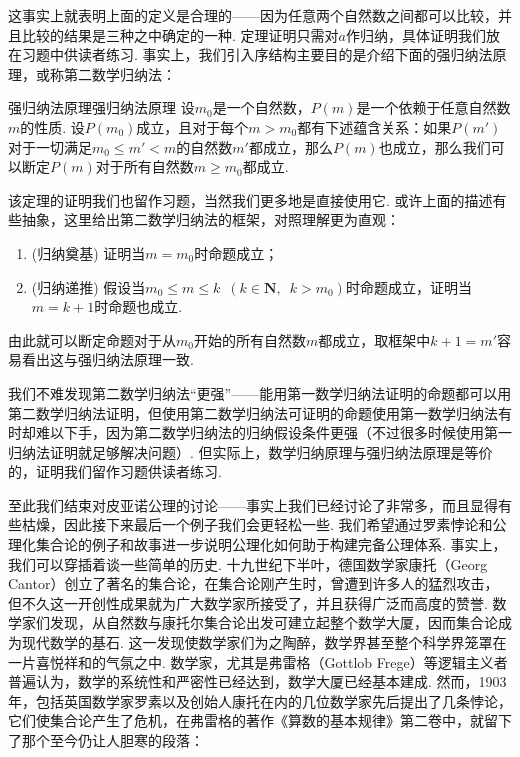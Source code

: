 这事实上就表明上面的定义是合理的——因为任意两个自然数之间都可以比较，并且比较的结果是三种之中确定的一种. 定理证明只需对$a$作归纳，具体证明我们放在习题中供读者练习. 事实上，我们引入序结构主要目的是介绍下面的强归纳法原理，或称第二数学归纳法：

\begin{theorem}{强归纳法原理}{强归纳法原理}
    设$m_0$是一个自然数，$P(m)$是一个依赖于任意自然数$m$的性质. 设$P(m_0)$成立，且对于每个$m > m_0$都有下述蕴含关系：如果$P(m')$对于一切满足$m_0\leqslant m'<m$的自然数$m'$都成立，那么$P(m)$也成立，那么我们可以断定$P(m)$对于所有自然数$m\geqslant m_0$都成立.
\end{theorem}

该定理的证明我们也留作习题，当然我们更多地是直接使用它. 或许上面的描述有些抽象，这里给出第二数学归纳法的框架，对照理解更为直观：
\begin{enumerate}
    \item (归纳奠基) 证明当$m=m_0$时命题成立；

    \item (归纳递推) 假设当$m_0\leqslant m \leqslant k\enspace(k\in\mathbf{N},\enspace k>m_0)$时命题成立，证明当$m=k+1$时命题也成立.
\end{enumerate}
由此就可以断定命题对于从$m_0$开始的所有自然数$m$都成立，取框架中$k+1=m'$容易看出这与强归纳法原理一致.

我们不难发现第二数学归纳法``更强''——能用第一数学归纳法证明的命题都可以用第二数学归纳法证明，但使用第二数学归纳法可证明的命题使用第一数学归纳法有时却难以下手，因为第二数学归纳法的归纳假设条件更强（不过很多时候使用第一归纳法证明就足够解决问题）. 但实际上，数学归纳原理与强归纳法原理是等价的，证明我们留作习题供读者练习.

至此我们结束对皮亚诺公理的讨论——事实上我们已经讨论了非常多，而且显得有些枯燥，因此接下来最后一个例子我们会更轻松一些. 我们希望通过罗素悖论和公理化集合论的例子和故事进一步说明公理化如何助于构建完备公理体系. 事实上，我们可以穿插着谈一些简单的历史. 十九世纪下半叶，德国数学家康托（Georg Cantor）创立了著名的集合论，在集合论刚产生时，曾遭到许多人的猛烈攻击，但不久这一开创性成果就为广大数学家所接受了，并且获得广泛而高度的赞誉. 数学家们发现，从自然数与康托尔集合论出发可建立起整个数学大厦，因而集合论成为现代数学的基石. 这一发现使数学家们为之陶醉，数学界甚至整个科学界笼罩在一片喜悦祥和的气氛之中. 数学家，尤其是弗雷格（Gottlob Frege）等逻辑主义者普遍认为，数学的系统性和严密性已经达到，数学大厦已经基本建成. 然而，1903年，包括英国数学家罗素以及创始人康托在内的几位数学家先后提出了几条悖论，它们使集合论产生了危机，在弗雷格的著作《算数的基本规律》第二卷中，就留下了那个至今仍让人胆寒的段落：

